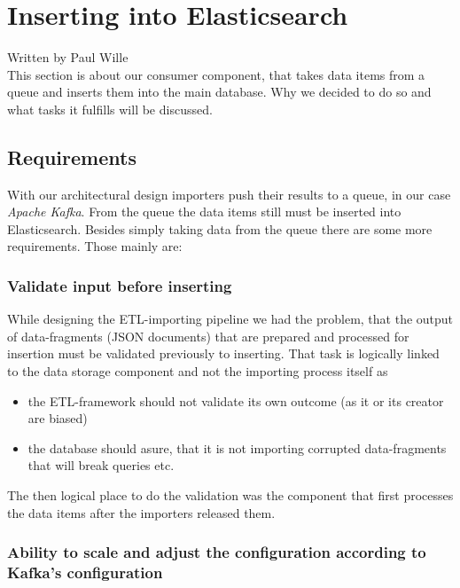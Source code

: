 \section{Inserting into Elasticsearch}\label{inserting-into-elasticsearch}
Written by Paul Wille \\

This section is about our consumer component, that takes data items from
a queue and inserts them into the main database. Why we decided to do so
and what tasks it fulfills will be discussed.

\subsection{Requirements}\label{requirements}

With our architectural design importers push their results to a queue,
in our case \emph{Apache Kafka}. From the queue the data items still
must be inserted into Elasticsearch. Besides simply taking data from the
queue there are some more requirements. Those mainly are:

\subsubsection{Validate input before inserting}\label{validate-input-before-inserting}

While designing the ETL-importing pipeline we had the problem, that the
output of data-fragments (JSON documents) that are prepared and
processed for insertion must be validated previously to inserting. That
task is logically linked to the data storage component and not the
importing process itself as

\begin{itemize}
\item
  the ETL-framework should not validate its own outcome (as it or its
  creator are biased)
\item
  the database should asure, that it is not importing corrupted
  data-fragments that will break queries etc.
\end{itemize}

The then logical place to do the validation was the component that first
processes the data items after the importers released them.

\subsubsection{Ability to scale and adjust the configuration according to
Kafka's configuration}\label{ability-to-scale-and-adjust-the-configuration-according-to-kafkas-configuration}

